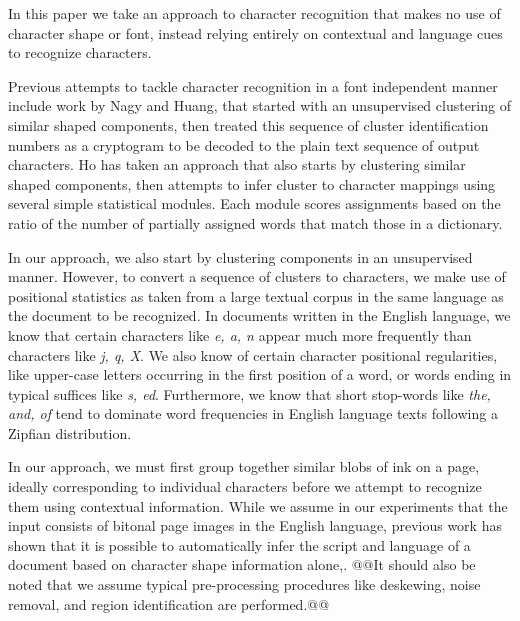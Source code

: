\documentclass[times, 10pt,twocolumn]{article}
\begin{document}
In this paper we take an approach to character recognition that makes no use of
character shape or font, instead relying entirely on contextual and language
cues to recognize characters.

Previous attempts to tackle character recognition in a font independent manner
include work by Nagy\cite{nagy1987} and Huang\cite{huang2006}, that started with
an unsupervised clustering of similar shaped components, then treated this
sequence of cluster identification numbers as a cryptogram to be decoded to the
plain text sequence of output characters.  Ho \cite{ho2000} has taken an
approach that also starts by clustering similar shaped components, then
attempts to infer cluster to character mappings using several simple
statistical modules.  Each module scores assignments based on the ratio of the
number of partially assigned words that match those in a dictionary.

In our approach, we also start by clustering components in an unsupervised
manner.  However, to convert a sequence of clusters to characters, we make use 
of positional statistics as taken from a large textual corpus in the same 
language as the document to be recognized.  In documents written in the 
English language, we know that certain characters like {\em e, a, n} appear 
much more frequently than characters like {\em j, q, X}.  We also know of 
certain character positional regularities, like upper-case letters occurring in 
the first position of a word, or words ending in typical suffices like {\em s, 
ed}.  Furthermore, we know that short stop-words like {\em the, and, of} tend 
to dominate word frequencies in English language texts following a Zipfian 
distribution.




In our approach, we must first group together similar blobs of ink on a
page, ideally corresponding to individual characters before we attempt to
recognize them using contextual information.  While we assume in our
experiments that the input consists of bitonal page images in the English 
language, previous work has shown that it is possible to automatically infer 
the script and language of a document based on character shape information
alone\cite{sibun1994},\cite{hochberg1997}.  @@It should also be noted that we
assume typical pre-processing procedures like deskewing, noise removal, and
region identification are performed.@@
\end{document}
